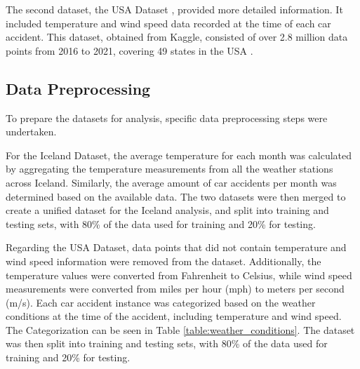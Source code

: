 \documentclass{article}
\begin{document}
The second dataset, the USA Dataset \cite{usa_data}, provided more detailed information. It included temperature and wind speed data recorded at the time of each car accident. This dataset, obtained from Kaggle, consisted of over 2.8 million data points from 2016 to 2021, covering 49 states in the USA \cite{usa_data}.

\subsection{Data Preprocessing}

To prepare the datasets for analysis, specific data preprocessing steps were undertaken.

For the Iceland Dataset, the average temperature for each month was calculated by aggregating the temperature measurements from all the weather stations across Iceland. Similarly, the average amount of car accidents per month was determined based on the available data. The two datasets were then merged to create a unified dataset for the Iceland analysis, and split into training and testing sets, with 80\% of the data used for training and 20\% for testing.

Regarding the USA Dataset, data points that did not contain temperature and wind speed information were removed from the dataset. Additionally, the temperature values were converted from Fahrenheit to Celsius, while wind speed measurements were converted from miles per hour (mph) to meters per second (m/s). Each car accident instance was categorized based on the weather conditions at the time of the accident, including temperature and wind speed. The Categorization can be seen in Table \ref{table:weather_conditions}. The dataset was then split into training and testing sets, with 80\% of the data used for training and 20\% for testing.
\end{document}
